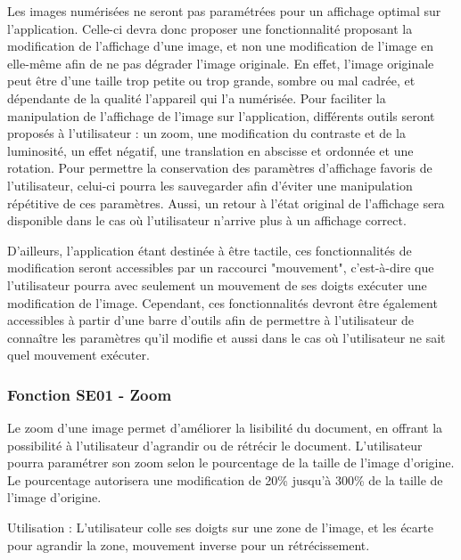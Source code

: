 \documentclass[a4paper]{article}
\begin{document}
Les images numérisées ne seront pas paramétrées pour un affichage optimal sur l’application. Celle-ci devra donc proposer une fonctionnalité proposant la modification de l’affichage d’une image, et non une modification de l’image en elle-même afin de ne pas dégrader l’image originale. En effet, l’image originale peut être d’une taille trop petite ou trop grande, sombre ou mal cadrée, et dépendante de la qualité l’appareil qui l’a numérisée. Pour faciliter la manipulation de l’affichage de l’image sur l’application, différents outils seront proposés à l’utilisateur : un zoom, une modification du contraste et de la luminosité, un effet négatif, une translation en abscisse et ordonnée et une rotation. Pour permettre la conservation des paramètres d’affichage favoris de l’utilisateur, celui-ci pourra les sauvegarder afin d’éviter une manipulation répétitive de ces paramètres. Aussi, un retour à l’état original de l’affichage sera disponible dans le cas où l’utilisateur n’arrive plus à un affichage correct.

D'ailleurs, l'application étant destinée à être tactile, ces fonctionnalités de modification seront accessibles par un raccourci "mouvement", c'est-à-dire que l'utilisateur pourra avec seulement un mouvement de ses doigts exécuter une modification de l'image. Cependant, ces fonctionnalités devront être également accessibles à partir d'une barre d'outils afin de permettre à l'utilisateur de connaître les paramètres qu'il modifie et aussi dans le cas où l'utilisateur ne sait quel mouvement exécuter.


\subsubsection{Fonction SE01 - Zoom}

Le zoom d'une image permet d'améliorer la lisibilité du document, en offrant la possibilité à l'utilisateur d'agrandir ou de rétrécir le document. L'utilisateur pourra paramétrer son zoom selon le pourcentage de la taille de l'image d'origine. Le pourcentage autorisera une modification de 20\% jusqu'à 300\% de la taille de l'image d'origine.

Utilisation : L'utilisateur colle ses doigts sur une zone de l'image, et les écarte pour agrandir la zone, mouvement inverse pour un rétrécissement.
\end{document}
